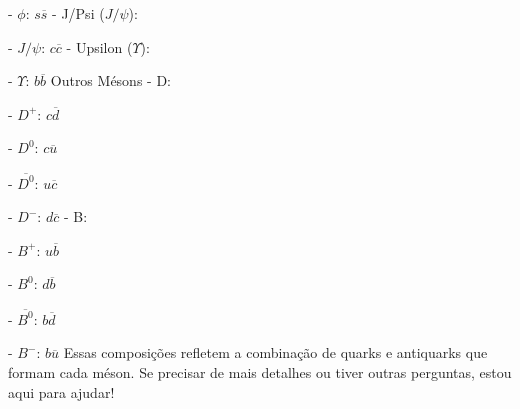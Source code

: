 \documentclass{article}
\begin{document}
    - $\phi$: $s\overline{s}$
\newline
\newline
- J/Psi ($J/\psi$):

    - $J/\psi$: $c\overline{c}$
\newline
\newline
- Upsilon ($\Upsilon$):

    - $\Upsilon$: $b\overline{b}$
\newline
\newline
Outros Mésons
\newline
\newline
- D:

    - $D^+$: $c\overline{d}$
    
    - $D^0$: $c\overline{u}$
    
    - $\overline{D^0}$: $u\overline{c}$
    
    - $D^-$: $d\overline{c}$
\newline
\newline
- B:

    - $B^+$: $u\overline{b}$
    
    - $B^0$: $d\overline{b}$
    
    - $\overline{B^0}$: $b\overline{d}$
    
    - $B^-$: $b\overline{u}$
\newline
\newline
Essas composições refletem a combinação de quarks e antiquarks que formam cada méson. Se precisar de mais detalhes ou tiver outras perguntas, estou aqui para ajudar!



\end{document}
